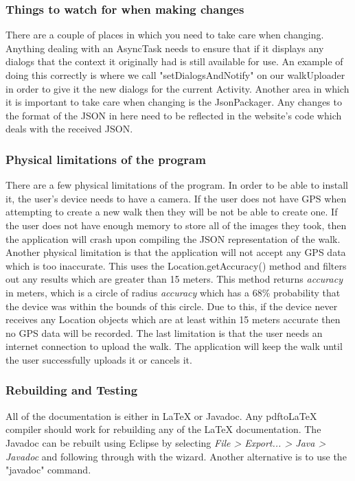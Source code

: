 \documentclass{project}
\begin{document}
\subsubsection{Things to watch for when making changes}
There are a couple of places in which you need to take care when changing. Anything dealing with an AsyncTask needs to ensure that if it displays any dialogs
that the context it originally had is still available for use. An example of doing this correctly is where we call "setDialogsAndNotify" on our walkUploader
in order to give it the new dialogs for the current Activity.
Another area in which it is important to take care when changing is the JsonPackager. Any changes to the format of the JSON in here need to be reflected
in the website's code which deals with the received JSON.

\subsubsection{Physical limitations of the program}
There are a few physical limitations of the program.
In order to be able to install it, the user's device needs to have a camera.
If the user does not have GPS when attempting to create a new walk then they will be not be able to create one.
If the user does not have enough memory to store all of the images they took, then the application will crash upon
compiling the JSON representation of the walk.
Another physical limitation is that the application will not accept any GPS data which is too inaccurate. This uses the Location.getAccuracy() method
and filters out any results which are greater than 15 meters. This method returns \textit{accuracy} in meters, which is a circle of radius \textit{accuracy}
which has a 68\% probability that the device was within the bounds of this circle.
Due to this, if the device never receives any Location objects which are at least within 15 meters accurate then no GPS data will be recorded.
The last limitation is that the user needs an internet connection to upload the walk. The application will keep the walk until the user successfully uploads
it or cancels it.

\subsubsection{Rebuilding and Testing}
All of the documentation is either in LaTeX or Javadoc. Any pdf\-to\-LaTeX compiler should work for rebuilding any of the LaTeX documentation.
The Javadoc can be rebuilt using Eclipse by selecting \textit{File \-> Export... \-> Java \-> Javadoc} and following through with the wizard.
Another alternative is to use the "javadoc" command.
\end{document}
